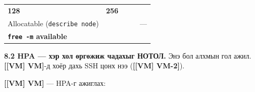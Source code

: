 \begin{longtable}[]{@{}lllll@{}}
\begin{minipage}[t]{0.17\columnwidth}
\textbf{128}\strut
\end{minipage} & \begin{minipage}[t]{0.17\columnwidth}\raggedright
\textbf{256}\strut
\end{minipage} & \begin{minipage}[t]{0.17\columnwidth}\raggedright
\strut
\end{minipage} & \begin{minipage}[t]{0.17\columnwidth}\raggedright
\strut
\end{minipage}\tabularnewline
\begin{minipage}[t]{0.17\columnwidth}\raggedright
Allocatable (\texttt{describe\ node})\strut
\end{minipage} & \begin{minipage}[t]{0.17\columnwidth}\raggedright
\strut
\end{minipage} & \begin{minipage}[t]{0.17\columnwidth}\raggedright
\strut
\end{minipage} & \begin{minipage}[t]{0.17\columnwidth}\raggedright
\strut
\end{minipage} & \begin{minipage}[t]{0.17\columnwidth}\raggedright
---\strut
\end{minipage}\tabularnewline
\begin{minipage}[t]{0.17\columnwidth}\raggedright
\textbf{\texttt{free\ -m} available}\strut
\end{minipage} & \begin{minipage}[t]{0.17\columnwidth}\raggedright
\strut
\end{minipage} & \begin{minipage}[t]{0.17\columnwidth}\raggedright
\strut
\end{minipage} & \begin{minipage}[t]{0.17\columnwidth}\raggedright
\strut
\end{minipage} & \begin{minipage}[t]{0.17\columnwidth}\raggedright
\strut
\end{minipage}\tabularnewline
\bottomrule
\end{longtable}\endgroup

\textbf{8.2 HPA --- хэр хол өргөжиж чадахыг НОТОЛ.} Энэ бол алхмын гол ажил. \textbf{{[}{[}VM{]} VM{]}}-д хоёр дахь SSH цонх нээ (\textbf{{[}{[}VM{]} VM-2{]}}).

\textbf{{[}{[}VM{]} VM{]}} --- HPA-г ажиглах:

